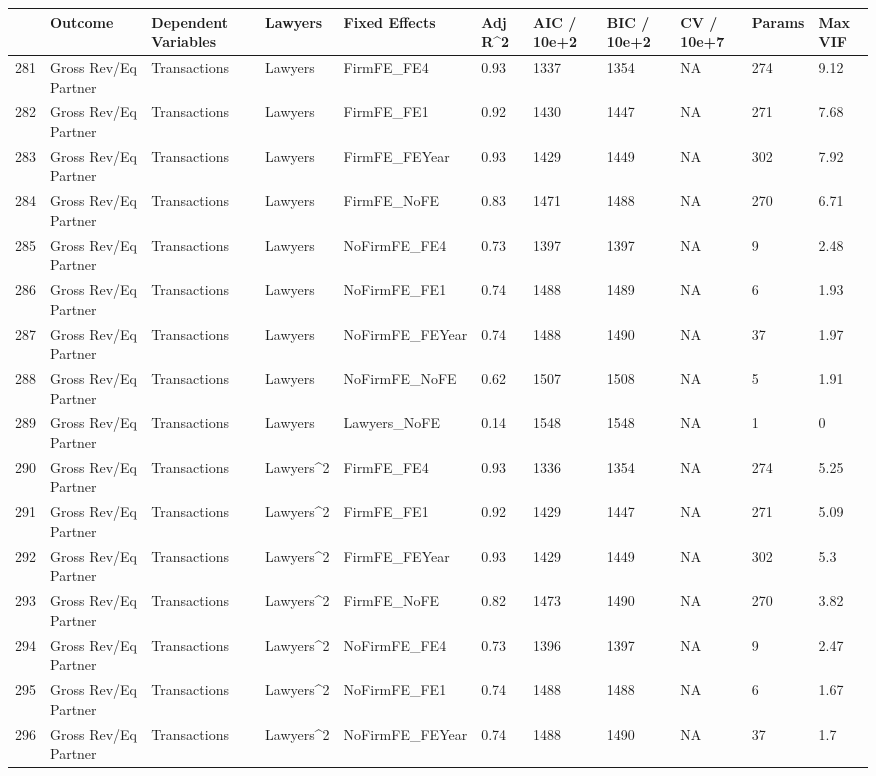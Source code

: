 \documentclass{article}
\begin{document}
\begin{table}[H]
\centering
\begin{tabular}{rllllllllll}
  \hline
 & Outcome & Dependent Variables & Lawyers & Fixed Effects & Adj R^2 & AIC / 10e+2 & BIC / 10e+2 & CV / 10e+7 & Params & Max VIF \\
  \hline
281 & Gross Rev/Eq Partner & Transactions & Lawyers & FirmFE\_FE4 & 0.93 & 1337 & 1354 & NA & 274 & 9.12 \\
  282 & Gross Rev/Eq Partner & Transactions & Lawyers & FirmFE\_FE1 & 0.92 & 1430 & 1447 & NA & 271 & 7.68 \\
  283 & Gross Rev/Eq Partner & Transactions & Lawyers & FirmFE\_FEYear & 0.93 & 1429 & 1449 & NA & 302 & 7.92 \\
  284 & Gross Rev/Eq Partner & Transactions & Lawyers & FirmFE\_NoFE & 0.83 & 1471 & 1488 & NA & 270 & 6.71 \\
  285 & Gross Rev/Eq Partner & Transactions & Lawyers & NoFirmFE\_FE4 & 0.73 & 1397 & 1397 & NA & 9 & 2.48 \\
  286 & Gross Rev/Eq Partner & Transactions & Lawyers & NoFirmFE\_FE1 & 0.74 & 1488 & 1489 & NA & 6 & 1.93 \\
  287 & Gross Rev/Eq Partner & Transactions & Lawyers & NoFirmFE\_FEYear & 0.74 & 1488 & 1490 & NA & 37 & 1.97 \\
  288 & Gross Rev/Eq Partner & Transactions & Lawyers & NoFirmFE\_NoFE & 0.62 & 1507 & 1508 & NA & 5 & 1.91 \\
  289 & Gross Rev/Eq Partner & Transactions & Lawyers & Lawyers\_NoFE & 0.14 & 1548 & 1548 & NA & 1 & 0 \\
  290 & Gross Rev/Eq Partner & Transactions & Lawyers^2 & FirmFE\_FE4 & 0.93 & 1336 & 1354 & NA & 274 & 5.25 \\
  291 & Gross Rev/Eq Partner & Transactions & Lawyers^2 & FirmFE\_FE1 & 0.92 & 1429 & 1447 & NA & 271 & 5.09 \\
  292 & Gross Rev/Eq Partner & Transactions & Lawyers^2 & FirmFE\_FEYear & 0.93 & 1429 & 1449 & NA & 302 & 5.3 \\
  293 & Gross Rev/Eq Partner & Transactions & Lawyers^2 & FirmFE\_NoFE & 0.82 & 1473 & 1490 & NA & 270 & 3.82 \\
  294 & Gross Rev/Eq Partner & Transactions & Lawyers^2 & NoFirmFE\_FE4 & 0.73 & 1396 & 1397 & NA & 9 & 2.47 \\
  295 & Gross Rev/Eq Partner & Transactions & Lawyers^2 & NoFirmFE\_FE1 & 0.74 & 1488 & 1488 & NA & 6 & 1.67 \\
  296 & Gross Rev/Eq Partner & Transactions & Lawyers^2 & NoFirmFE\_FEYear & 0.74 & 1488 & 1490 & NA & 37 & 1.7 \\

\end{tabular}
\end{table}
\end{document}
